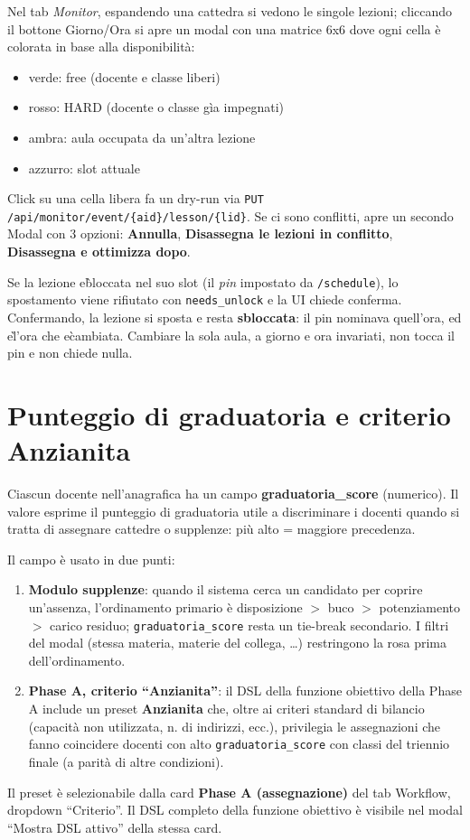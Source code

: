 Nel tab \emph{Monitor}, espandendo una cattedra si vedono le singole
lezioni; cliccando il bottone Giorno/Ora si apre un modal con una
matrice 6x6 dove ogni cella \`e colorata in base alla disponibilit\`a:

\begin{itemize}
  \item verde: free (docente e classe liberi)
  \item rosso: HARD (docente o classe g\`ia impegnati)
  \item ambra: aula occupata da un'altra lezione
  \item azzurro: slot attuale
\end{itemize}

Click su una cella libera fa un dry-run via
\texttt{PUT /api/monitor/event/\{aid\}/lesson/\{lid\}}. Se
ci sono conflitti, apre un secondo Modal con 3 opzioni:
\textbf{Annulla}, \textbf{Disassegna le lezioni in conflitto},
\textbf{Disassegna e ottimizza dopo}.

Se la lezione e\` bloccata nel suo slot (il \emph{pin} impostato da
\texttt{/schedule}), lo spostamento viene rifiutato con
\texttt{needs\_unlock} e la UI chiede conferma. Confermando, la lezione
si sposta e resta \textbf{sbloccata}: il pin nominava quell'ora, ed e\`
l'ora che e\` cambiata. Cambiare la sola aula, a giorno e ora
invariati, non tocca il pin e non chiede nulla.

\section{Punteggio di graduatoria e criterio Anzianita}

Ciascun docente nell'anagrafica ha un campo
\textbf{graduatoria\_score} (numerico). Il valore esprime il
punteggio di graduatoria utile a discriminare i docenti quando
si tratta di assegnare cattedre o supplenze: pi\`u alto =
maggiore precedenza.

Il campo \`e usato in due punti:

\begin{enumerate}
\item \textbf{Modulo supplenze}: quando il sistema cerca un
  candidato per coprire un'assenza, l'ordinamento primario
  \`e disposizione $>$ buco $>$ potenziamento $>$ carico
  residuo; \texttt{graduatoria\_score} resta un
  tie-break secondario. I filtri del modal (stessa materia,
  materie del collega, \ldots) restringono la rosa prima
  dell'ordinamento.
\item \textbf{Phase A, criterio ``Anzianita''}: il DSL della
  funzione obiettivo della Phase A include un preset
  \textbf{Anzianita} che, oltre ai criteri standard di bilancio
  (capacit\`a non utilizzata, n. di indirizzi, ecc.),
  privilegia le assegnazioni che fanno coincidere docenti con
  alto \texttt{graduatoria\_score} con classi del triennio
  finale (a parit\`a di altre condizioni).
\end{enumerate}

Il preset \`e selezionabile dalla card \textbf{Phase A
(assegnazione)} del tab Workflow, dropdown ``Criterio''. Il DSL
completo della funzione obiettivo \`e visibile nel modal
``Mostra DSL attivo'' della stessa card.

